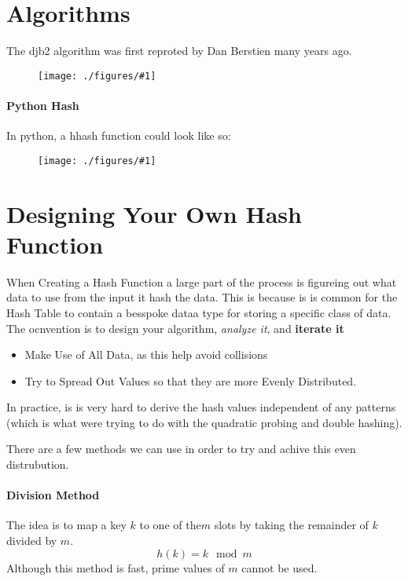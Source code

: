 \documentclass[12pt]{book}
\title{\coursetitle\linebreak\lecturename}
\author{\\Cain Susko\\ 
           \\ \\ \\
      Queen's University 
    \\School of Computing\\}
\newcommand{\incimg}[2]{%
       \begin{figure}[h]
               \centering
               \texttt{[image: ./figures/\#1]}
       \end{figure}
}
\begin{document}
\begin{titlepage}
        \maketitle
\end{titlepage}


\section*{Algorithms}
The djb2 algorithm was first reproted by Dan Berstien many years ago.
\incimg{djb2}{0.5}

\paragraph{Python Hash}
In python, a hhash function could look like so:
\incimg{hashpy}{0.5}

\section*{Designing Your Own Hash Function}
When Creating a  Hash Function a large part of the process is figureing out what data to use from the input it hash the data. This is because is
is common for the Hash Table to contain a besspoke dataa  type for storing a specific class of data. The ocnvention is to design your algorithm,
\textit{analyze it}, and \textbf{iterate it}
\begin{itemize}
        \item[\textbf{Tip 1}] Make Use of All Data, as this help avoid collisions
        \item[\textbf{Tip 2}] Try to Spread Out Values so that they are more Evenly Distributed.
\end{itemize}

In practice, is is very hard to derive the hash values independent of any patterns (which is what were trying to do with the quadratic probing and
double hashing).

There are a few methods we can use in order to try and achive this even distrubution.

\paragraph{Division Method}
The idea is to map a key $k$ to one of the$m$ slots by taking the remainder of $k$ divided by $m$.
\[h(k) = k\mod m\]
Although this method is fast, prime values of $m$ cannot be used.
\end{document}
